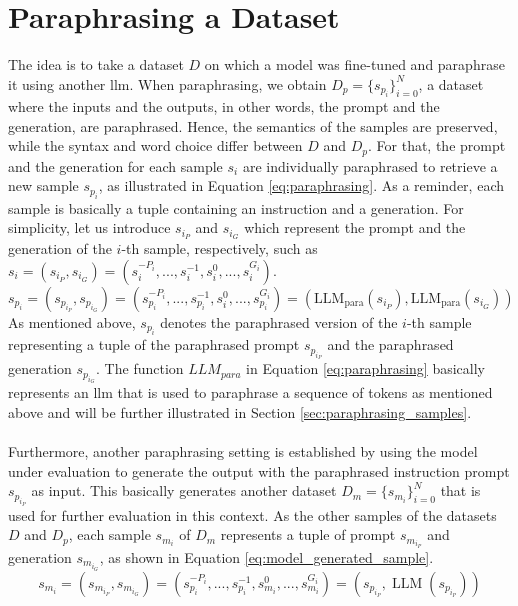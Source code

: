 \section{Paraphrasing a Dataset}\label{sec:paraphrasing_a_dataset}
The idea is to take a dataset $D$ on which a model was fine-tuned and paraphrase it using another \acrshort{llm}. When paraphrasing, we obtain $D_p = \{s_{p_i}\}_{i=0}^N$, a dataset where the inputs and the outputs, in other words, the prompt and the generation, are paraphrased. Hence, the semantics of the samples are preserved, while the syntax and word choice differ between $D$ and $D_p$. For that, the prompt and the generation for each sample $s_i$ are individually paraphrased to retrieve a new sample $s_{p_i}$, as illustrated in Equation \ref{eq:paraphrasing}. As a reminder, each sample is basically a tuple containing an instruction and a generation. For simplicity, let us introduce $s_{i_P}$ and $s_{i_G}$ which represent the prompt and the generation of the $i$-th sample, respectively, such as $s_i = (s_{i_P}, s_{i_G}) = (s_i^{-P_i},...,s_i^{-1}, s_i^0,...,s_i^{G_i})$.
\begin{equation}
    s_{p_i} = 
    (
    s_{p_{i_P}},
    s_{p_{i_G}}
    ) =
    (
        s_{p_i}^{-P_i},...,s_{p_i}^{-1},
        s_i^0,...,s_{p_i}^{G_i}
    ) = 
    (
        \operatorname{LLM_{para}}(s_{i_P}), 
        \operatorname{LLM_{para}}(s_{i_G})
    )
    \label{eq:paraphrasing}
\end{equation}
As mentioned above, $s_{p_i}$ denotes the paraphrased version of the $i$-th sample representing a tuple of the paraphrased prompt $s_{p_{i_P}}$ and the paraphrased generation $s_{p_{i_G}}$. The function $LLM_{para}$ in Equation \ref{eq:paraphrasing} basically represents an \acrshort{llm} that is used to paraphrase a sequence of tokens as mentioned above and will be further illustrated in Section \ref{sec:paraphrasing_samples}.
\\\\
Furthermore, another paraphrasing setting is established by using the model under evaluation to generate the output with the paraphrased instruction prompt $s_{p_{i_P}}$ as input. This basically generates another dataset $D_m = \{s_{m_i}\}_{i=0}^N$ that is used for further evaluation in this context. As the other samples of the datasets $D$ and $D_p$, each sample $s_{m_i}$ of $D_m$ represents a tuple of prompt $s_{m_{i_P}}$ and generation $s_{m_{i_G}}$, as shown in Equation \ref{eq:model_generated_sample}.
\begin{equation}
    s_{m_i} = 
    (
    s_{m_{i_P}},
    s_{m_{i_G}}
    ) =
    (
        s_{p_i}^{-P_i},...,s_{p_i}^{-1},
        s_{m_i}^0,...,s_{m_i}^{G_i}
    ) = 
    (
        s_{p_{i_P}}, 
        \operatorname{LLM}(s_{p_{i_P}})
    )
    \label{eq:model_generated_sample}
\end{equation}
